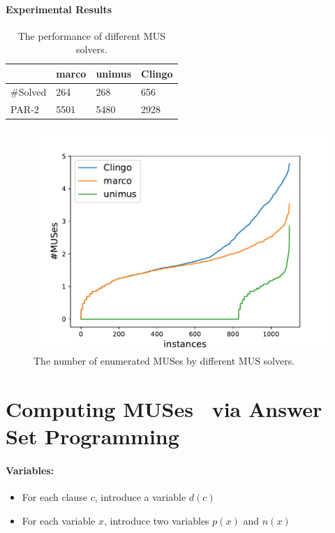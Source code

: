 \documentclass{article}
\begin{document}
\paragraph{Experimental Results}
\begin{table}[h]
  \centering
  \begin{tabular}{m{5em} m{5em} m{6em} m{10em}} 
  \toprule
   & marco & unimus & Clingo\\
  \midrule
  \#Solved & 264 & 268 & 656\\
  \midrule
  PAR-$2$ & 5501 & 5480 & 2928\\
  \bottomrule
  \end{tabular}
  \caption{The performance of different MUS solvers.}
  \label{table:mus_counting_result}
\end{table}

\begin{figure}
  \centering
  \includegraphics[scale=0.5]{images/countMUS.pdf}
  \caption{The number of enumerated MUSes by different MUS solvers.}
\end{figure}


\newpage
\section{Computing MUSes~\cite{LPMM2016} via Answer Set Programming}
\paragraph{Variables:}
\begin{itemize}
    \item For each clause $c$, introduce a variable $d(c)$
    \item For each variable $x$, introduce two variables $p(x)$ and $n(x)$
\end{itemize}
\end{document}

